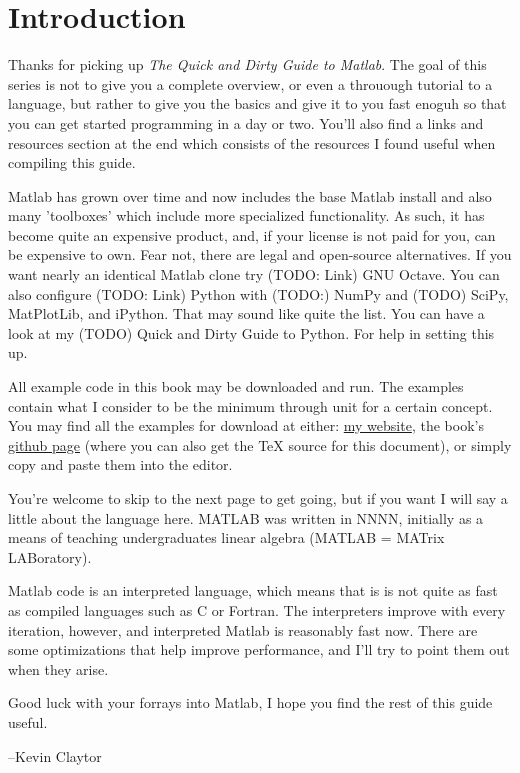 \section{Introduction}

Thanks for picking up \emph{The Quick and Dirty Guide to Matlab}. 
The goal of this series is not to give you a complete overview, or even a throuough tutorial to a language,
 but rather to give you the basics and give it to you fast enoguh so that you can get started programming in a day or two. 
You'll also find a links and resources section at the end which consists of the resources I found useful when compiling this guide.

Matlab has grown over time and now includes the base Matlab install and also many 'toolboxes' which include more specialized functionality.
 As such, it has become quite an expensive product, and, if your license is not paid for you, can be expensive to own.
 Fear not, there are legal and open-source alternatives.
 If you want nearly an identical Matlab clone try (TODO: Link) GNU Octave.
 You can also configure (TODO: Link) Python with (TODO:) NumPy and (TODO) SciPy, MatPlotLib, and iPython.
 That may sound like quite the list. You can have a look at my (TODO) Quick and Dirty Guide to Python. For help in setting this up.

All example code in this book may be downloaded and run. The examples contain what I consider to be the minimum through unit for a certain concept.
You may find all the examples for download at either:
 \href{http://people.duke.edu/~kec30/}{my website}, the book's
 \href{https://github.com/KEClaytor/QuickDirtyMatlab}{github page} (where you can also get the TeX source for this document),
 or simply copy and paste them into the editor.

You're welcome to skip to the next page to get going, but if you want I will say a little about the language here.
MATLAB was written in NNNN, initially as a means of teaching undergraduates linear algebra (MATLAB = MATrix LABoratory).

Matlab code is an interpreted language, which means that is is not quite as fast as compiled languages such as C or Fortran.
 The interpreters improve with every iteration, however, and interpreted Matlab is reasonably fast now.
 There are some optimizations that help improve performance, and I'll try to point them out when they arise.

Good luck with your forrays into Matlab, I hope you find the rest of this guide useful.

    --Kevin Claytor
